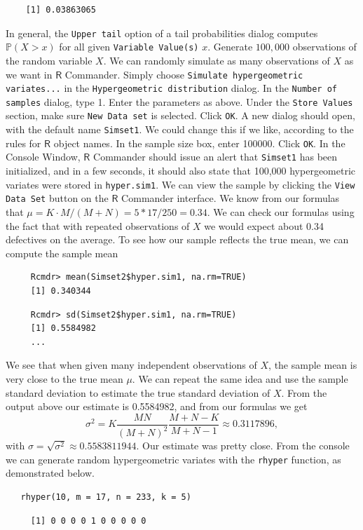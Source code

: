 \documentclass[captions=tableheading]{scrbook}
\begin{document}
\begin{example}
\begin{verbatim}
    [1] 0.03863065
\end{verbatim}

   In general, the \texttt{Upper tail} option of a tail probabilities dialog computes \(\mathbb{P}(X > x)\) for all given \texttt{Variable Value(s)} \(x\).
Generate \(100,000\) observations of the random variable \(X\).
   We can randomly simulate as many observations of \(X\) as we want in \(\mathsf{R}\) Commander. Simply choose \texttt{Simulate hypergeometric variates...} in the \texttt{Hypergeometric distribution} dialog. 
   In the \texttt{Number of samples} dialog, type 1. Enter the parameters as above. Under the \texttt{Store Values} section, make sure \texttt{New Data set} is selected. Click \texttt{OK}. 
   A new dialog should open, with the default name \texttt{Simset1}.  We could change this if we like, according to the rules for \(\mathsf{R}\) object names. In the sample size box, enter 100000. Click \texttt{OK}. 
   In the Console Window, \(\mathsf{R}\) Commander should issue an alert that \texttt{Simset1} has been initialized, and in a few seconds, it should also state that 100,000 hypergeometric variates were stored in \texttt{hyper.sim1}. We can view the sample by clicking the \texttt{View Data Set} button on the \(\mathsf{R}\) Commander interface.
   We know from our formulas that \(\mu=K\cdot M/(M+N)=5*17/250=0.34\). We can check our formulas using the fact that with repeated observations of \(X\) we would expect about 0.34 defectives on the average. To see how our sample reflects the true mean, we can compute the sample mean
\begin{verbatim}
     Rcmdr> mean(Simset2$hyper.sim1, na.rm=TRUE)
     [1] 0.340344
\end{verbatim}
   
\begin{verbatim}
     Rcmdr> sd(Simset2$hyper.sim1, na.rm=TRUE)
     [1] 0.5584982
     ...
\end{verbatim}
   We see that when given many independent observations of \(X\), the sample mean is very close to the true mean \(\mu\). We can repeat the same idea and use the sample standard deviation to estimate the true standard deviation of \(X\). From the output above our estimate is 0.5584982, and from our formulas we get
   \[
   \sigma^{2}=K\frac{MN}{(M+N)^{2}}\frac{M+N-K}{M+N-1}\approx0.3117896,
   \]
   with \(\sigma=\sqrt{\sigma^{2}}\approx0.5583811944\). Our estimate was pretty close.
   From the console we can generate random hypergeometric variates with the \texttt{rhyper} function, as demonstrated below.


\lstset{language=R}
\begin{lstlisting}
   rhyper(10, m = 17, n = 233, k = 5)
\end{lstlisting}

\begin{verbatim}
     [1] 0 0 0 0 1 0 0 0 0 0
\end{verbatim}

\end{example}
\end{document}
